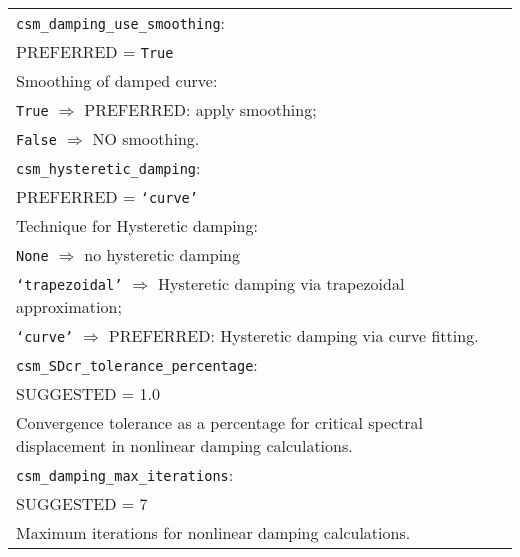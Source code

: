 \vspace{2em}
\begin{tabular}{|p{\textwidth}|}
\hline \vspace{0.1em} \texttt{csm\_damping\_use\_smoothing}: \\
PREFERRED = \texttt{True} \\
Smoothing of damped curve: \\
 \hspace{0.5em} \texttt{True} $\Rightarrow$ \small{PREFERRED}: apply smoothing; \\
 \hspace{0.5em} \texttt{False} $\Rightarrow$ NO smoothing.\\
\hline \vspace{0.1em} \texttt{csm\_hysteretic\_damping}: \\
PREFERRED = \texttt{`curve'} \\
Technique for Hysteretic  damping: \\
 \hspace{0.5em} \texttt{None} $\Rightarrow$ no hysteretic  damping \\
 \hspace{0.5em} \texttt{`trapezoidal'} $\Rightarrow$ Hysteretic  damping via trapezoidal approximation; \\
 \hspace{0.5em} \texttt{`curve'} $\Rightarrow$ \small{PREFERRED}: Hysteretic  damping via curve fitting. \\
\hline \vspace{0.1em} \texttt{csm\_SDcr\_tolerance\_percentage}: \\
SUGGESTED = 1.0 \\
Convergence tolerance as a percentage for critical spectral
displacement in nonlinear damping calculations. \\
\hline \vspace{0.1em} \texttt{csm\_damping\_max\_iterations}: \\
SUGGESTED = 7 \\
 Maximum iterations for nonlinear damping calculations.\\
 \hline
 \end{tabular}


